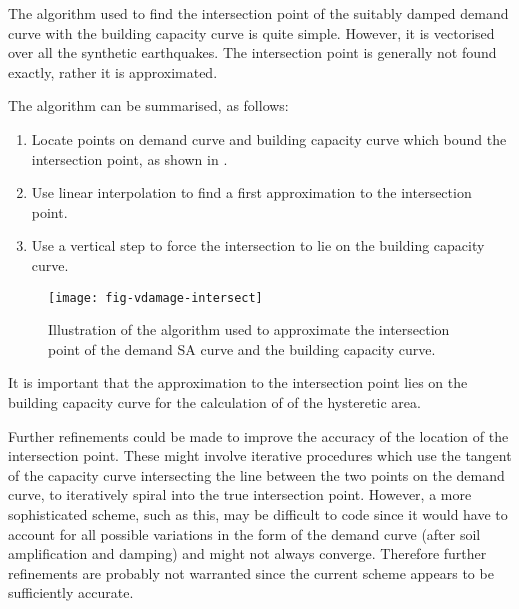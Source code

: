 The algorithm used to find the intersection point of the suitably
damped demand curve with the building capacity
curve is quite simple. However, it is
vectorised over all the synthetic earthquakes. The intersection
point is generally not found exactly, rather it is approximated.

The algorithm can be summarised, as follows:
\begin{enumerate}
\item Locate points on demand curve and
building capacity curve which bound the
intersection point, as shown in .
\item Use linear interpolation to find a first approximation to
the
  intersection point.
\item Use a vertical step to force the intersection to lie on the
  building capacity curve.
\end{enumerate}


\begin{figure}[htp]
\centering
\texttt{[image: fig-vdamage-intersect]}
\caption{Illustration of the algorithm used to approximate the
intersection point of the demand SA curve and the building
capacity curve.}
\label{fig:vdamage-intersection}
\end{figure}

It is important that the approximation to the intersection point
lies on the building capacity curve for the
calculation of of the hysteretic area.

Further refinements could be made to improve the accuracy of the
location of the intersection point. These might involve iterative
procedures which use the tangent of the capacity
curve intersecting the line between the two
points on the demand curve, to iteratively
spiral into the true intersection point. However, a more
sophisticated scheme, such as this, may be difficult to code since
it would have to account for all possible variations in the form
of the demand curve (after soil amplification
and damping) and might not always converge. Therefore further
refinements are probably not warranted since the current scheme
appears to be sufficiently accurate.






